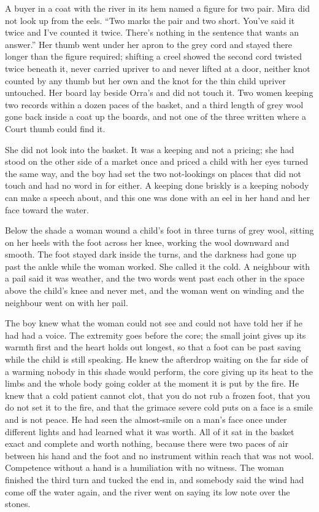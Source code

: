 A buyer in a coat with the river in its hem named a figure for two pair. Mira did not look up from the eels. “Two marks the pair and two short. You've said it twice and I've counted it twice. There's nothing in the sentence that wants an answer.” Her thumb went under her apron to the grey cord and stayed there longer than the figure required; shifting a creel showed the second cord twisted twice beneath it, never carried upriver to  and never lifted at a door, neither knot counted by any thumb but her own and the knot for the thin child upriver untouched. Her board lay beside Orra's and did not touch it. Two women keeping two records within a dozen paces of the basket, and a third length of grey wool gone back inside a coat up the boards, and not one of the three written where a Court thumb could find it.

She did not look into the basket. It was a keeping and not a pricing; she had stood on the other side of a market once and priced a child with her eyes turned the same way, and the boy had set the two not-lookings on places that did not touch and had no word in  for either. A keeping done briskly is a keeping nobody can make a speech about, and this one was done with an eel in her hand and her face toward the water.

Below the shade a woman wound a child's foot in three turns of grey wool, sitting on her heels with the foot across her knee, working the wool downward and smooth. The foot stayed dark inside the turns, and the darkness had gone up past the ankle while the woman worked. She called it the cold. A neighbour with a pail said it was weather, and the two words went past each other in the space above the child's knee and never met, and the woman went on winding and the neighbour went on with her pail.

The boy knew what the woman could not see and could not have told her if he had had a voice. The extremity goes before the core; the small joint gives up its warmth first and the heart holds out longest, so that a foot can be past saving while the child is still speaking. He knew the afterdrop waiting on the far side of a warming nobody in this shade would perform, the core giving up its heat to the limbs and the whole body going colder at the moment it is put by the fire. He knew that a cold patient cannot clot, that you do not rub a frozen foot, that you do not set it to the fire, and that the grimace severe cold puts on a face is a smile and is not peace. He had seen the almost-smile on a man's face once under different lights and had learned what it was worth. All of it sat in the basket exact and complete and worth nothing, because there were two paces of air between his hand and the foot and no instrument within reach that was not wool. Competence without a hand is a humiliation with no witness. The woman finished the third turn and tucked the end in, and somebody said the wind had come off the water again, and the river went on saying its low note over the stones.

